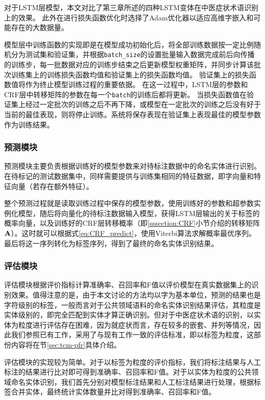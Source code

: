 对于LSTM层模型，本文对比了第三章所述的四种LSTM变体在中医症状术语识别上的效果。
此外在进行损失函数优化时选择了Adam优化器以适应高维字嵌入和可能存在的大数据量。

模型层中训练函数的实现即是在模型成功初始化后，将全部训练数据按一定比例随机分为测试集和验证集，并根据\verb|batch_size|的设置批量输入数据完成前后向传播的训练步，每一批数据对应的训练步结束之后更新模型权重矩阵，并同步计算该批次训练集上的训练损失函数均值和验证集上的损失函数均值。
验证集上的损失函数值将作为终止模型训练过程的重要依据。
在这一过程中，LSTM层的参数和CRF层中转移矩阵的参数在每一个\verb|batch|的训练后都将更新。
当损失函数值在验证集上经过一定批次的训练之后不再下降，或模型在一定批次的训练之后没有好于当前的最佳表现，则将停止训练。系统将保存表现在验证集上表现最佳的模型参数作为训练结果。

\subsubsection{预测模块}
预测模块主要负责根据训练好的模型参数来对待标注数据中的命名实体进行识别。
在待标记的测试数据集中，同样需要提供与训练集相同的特征数据，即字向量和特征向量（若存在额外特征）。

整个预测过程就是读取训练过程中保存的模型参数，使用训练好的参数和超参数实例化模型，随后将向量化的待标注数据输入模型，获得LSTM层输出的关于标签的概率向量，以及训练好的CRF层转移概率（即\ref{sssection:CRF}小节介绍的转移矩阵$\boldsymbol{\mathbf{A}}$）。这时就可以根据式\ref{eq:CRF_predict}，使用Viterbi算法求解概率最优序列。最后将这一序列转化为标签序列，得到了最终的命名实体识别结果。

\subsubsection{评估模块}
评估模块根据评价指标计算准确率、召回率和F值以评价模型在真实数据集上的识别效果。值得注意的是，由于本文讨论的方法均以字为基本单位，预测的结果也是字符级别的标签，一般而言对于公共领域语料的命名实体识别结果评估，其粒度是实体级别的，即完全匹配到实体才算正确识别。但对于中医症状术语的识别，以实体为粒度进行评估存在困难，因为就症状而言，存在较多的嵌套、并列等情况，因此我们参照已有工作，采用了与现有工作一致的评估标准，即以标签为粒度，这部份内容将在节\ref{sec:tcm-pfr}具体介绍。

评估模块的实现较为简单。对于以标签为粒度的评价指标，我们将标注结果与人工标注的结果进行比对即可得到准确率、召回率和F值。对于以实体为粒度的公共领域命名实体识别，我们首先分别对模型标注结果和人工标注结果进行处理，根据标签合并实体，最终统计实体数量并比对得到准确率、召回率和F值。

